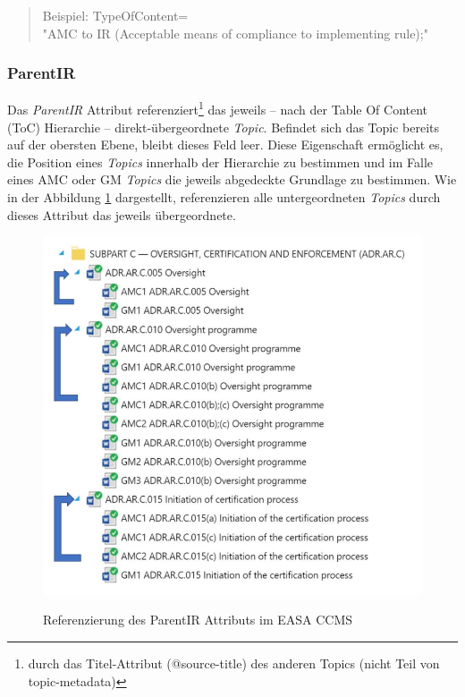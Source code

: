     \begin{quote}
    Beispiel:
    \textsf{TypeOfContent=\\"{}AMC to IR (Acceptable means of compliance to implementing rule);"}
\end{quote}

    
    \subsubsection{ParentIR}

    Das \textit{ParentIR} Attribut referenziert\footnote{durch das Titel-Attribut (@source-title) des anderen Topics (nicht Teil von topic-metadata)} das jeweils -- nach der Table Of Content (ToC) Hierarchie -- direkt-übergeordnete \textit{Topic}.
    Befindet sich das Topic bereits auf der obersten Ebene, bleibt dieses Feld leer.
    Diese Eigenschaft ermöglicht es, die Position eines \textit{Topics} innerhalb der Hierarchie zu bestimmen und im Falle eines \ac{AMC} oder \ac{GM} \textit{Topics} die jeweils abgedeckte Grundlage zu bestimmen.
    Wie in der Abbildung \ref{fig:parent_ir} dargestellt, referenzieren alle untergeordneten \textit{Topics} durch dieses Attribut das jeweils übergeordnete. 

    \begin{figure}[h]
        \centering
        \includegraphics[width=0.75\linewidth]{gfx/parentir.png}
        \caption{Referenzierung des ParentIR Attributs im EASA CCMS}
                                                                                    \cite[31]{easa_xml_doc}
        \label{fig:parent_ir}
    \end{figure}

